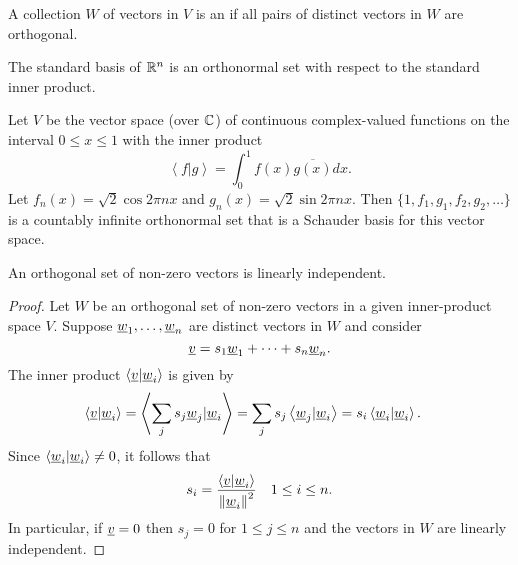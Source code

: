 \begin{definition}
A collection $W$ of vectors in $V$ is an  if all pairs of distinct vectors in $W$ are orthogonal.
\end{definition}

\begin{example}
The standard basis of $\mathbb{R}^n$ is an orthonormal set with respect to the standard inner product.
\end{example}

\begin{example}
Let $V$ be the vector space (over $\mathbb{C}$) of continuous complex-valued functions on the interval $0 \leq x \leq 1$ with the inner product
\begin{equation*}
\left\langle f | g \right\rangle = \int_0^1 f(x) \overline{g(x)} dx.
\end{equation*}
Let $f_n(x) = \sqrt{2} \cos 2 \pi n x$ and $g_n (x) = \sqrt{2} \sin 2 \pi n x$.
Then $\{ 1, f_1, g_1, f_2, g_2, \ldots \}$ is a countably infinite orthonormal set that is a Schauder basis for this vector space.
\end{example}

\begin{theorem}
An orthogonal set of non-zero vectors is linearly independent.
\end{theorem}
\begin{proof}
Let $W$ be an orthogonal set of non-zero vectors in a given inner-product space $V$.
Suppose $\underline{w}_1, \ldots, \underline{w}_n$ are distinct vectors in $W$ and consider
\begin{equation*}
\underline{v} = s_1 \underline{w}_1 + \cdots + s_n \underline{w}_n.
\end{equation*}
The inner product $\left\langle \underline{v} | \underline{w}_i \right\rangle$ is given by
\begin{equation*}
\begin{split}
\left\langle \underline{v} | \underline{w}_i \right\rangle
&= \left\langle \sum_j s_j \underline{w}_j | \underline{w}_i \right\rangle
= \sum_j s_j \left\langle \underline{w}_j | \underline{w}_i \right\rangle
= s_i \left\langle \underline{w}_i | \underline{w}_i \right\rangle .
\end{split}
\end{equation*}
Since $\left\langle \underline{w}_i | \underline{w}_i \right\rangle \neq 0$, it follows that
\begin{equation*}
s_i = \frac{ \left\langle \underline{v} | \underline{w}_i \right\rangle }
{ \left\| \underline{w}_i \right\|^2 }
\quad 1 \leq i \leq n.
\end{equation*}
In particular, if $\underline{v} = 0$ then $s_j = 0$ for $1 \leq j \leq n$ and the vectors in $W$ are linearly independent.
\end{proof}


